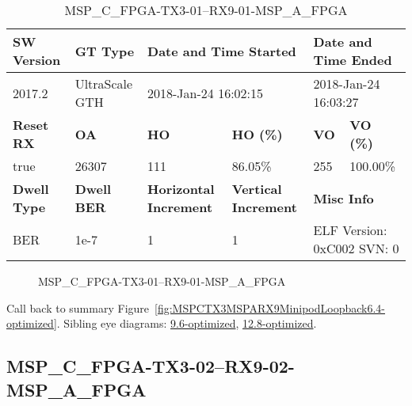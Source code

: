\begin{table}[h]
\centering
\caption{MSP\_C\_FPGA-TX3-01--RX9-01-MSP\_A\_FPGA}
\label{tab:MSPCFPGATX301RX901MSPAFPGA6.4-optimized}
\begin{tabular}{@{}|l|l|l|l|l|l|@{}}
\toprule
\textbf{SW Version}                & \textbf{GT Type}   & \multicolumn{2}{l|}{\textbf{Date and Time Started}}            & \multicolumn{2}{l|}{\textbf{Date and Time Ended}}        \\ \midrule
2017.2                       & UltraScale GTH          & \multicolumn{2}{l|}{2018-Jan-24 16:02:15}                   & \multicolumn{2}{l|}{2018-Jan-24 16:03:27}               \\ \midrule
\textbf{Reset RX}                  & \textbf{OA} & \textbf{HO}   & \textbf{HO (\%)} & \textbf{VO} & \textbf{VO (\%)} \\ \midrule
true & 26307        & 111          & 86.05\%        & 255        & 100.00\%       \\ \midrule
\textbf{Dwell Type}                & \textbf{Dwell BER} & \textbf{Horizontal Increment} & \textbf{Vertical Increment}    & \multicolumn{2}{l|}{\textbf{Misc Info}}                  \\ \midrule
BER                            & 1e-7        & 1        & 1           & \multicolumn{2}{l|}{ELF Version: 0xC002 SVN: 0}                         \\ \bottomrule
\end{tabular}
\end{table}

\begin{figure}[h]
\caption{MSP\_C\_FPGA-TX3-01--RX9-01-MSP\_A\_FPGA} \label{fig:MSPCFPGATX301RX901MSPAFPGA6.4-optimized}
\end{figure}

Call back to summary Figure~\ref{fig:MSPCTX3MSPARX9MinipodLoopback6.4-optimized}.
Sibling eye diagrams: \hyperref[sec:MSPCFPGATX301RX901MSPAFPGA9.6-optimized]{9.6-optimized}, \hyperref[sec:MSPCFPGATX301RX901MSPAFPGA12.8-optimized]{12.8-optimized}.

\clearpage
\newpage


\subsection{MSP\_C\_FPGA-TX3-02--RX9-02-MSP\_A\_FPGA}\label{sec:MSPCFPGATX302RX902MSPAFPGA6.4-optimized}

